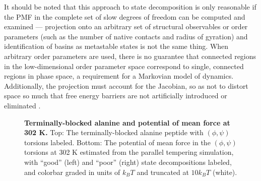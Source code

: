 It should be noted that this approach to state decomposition is only reasonable if the PMF in the complete set of slow degrees of freedom can be computed and examined --- projection onto an arbitrary set of structural observables or order parameters (such as the number of native contacts and radius of gyration) and identification of basins as metastable states is not the same thing.  When arbitrary order parameters are used, there is no guarantee that connected regions in the low-dimensional order parameter space correspond to single, connected regions in phase space, a requirement for a Markovian model of dynamics.
Additionally, the projection must account for the Jacobian, so as not to distort space so much that free energy barriers are not artificially introduced or eliminated \cite{hartmann:2004a,hartmann:2004b}.

\begin{figure}[tbp]
  \begin{center}
  \end{center}
  \caption{
  {\bf Terminally-blocked alanine and potential of mean force at 302 K.}  
  Top: The terminally-blocked alanine peptide with $(\phi,\psi)$ torsions labeled.  
  Bottom: The potential of mean force in the $(\phi,\psi)$ torsions at 302 K estimated from the parallel tempering simulation, with ``good'' (left) and ``poor'' (right) state decompositions labeled, and colorbar graded in units of $k_B T$ and truncated at $10 k_B T$ (white).  
  }
  \label{validation:figure:2d-pmf}
\end{figure}

